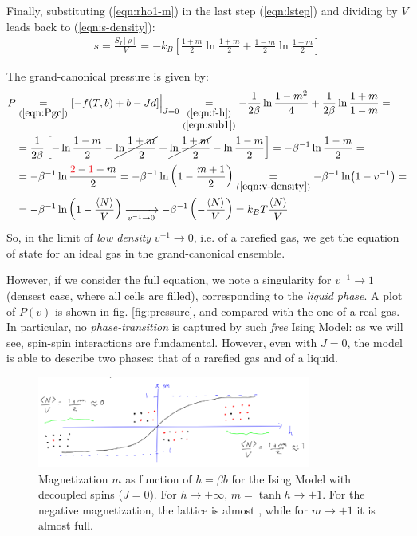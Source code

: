 \documentclass[../template.tex]{subfiles}
\begin{document}
\begin{example}
    \medskip

    Finally, substituting (\ref{eqn:rho1-m}) in the last step (\ref{eqn:lstep}) and dividing by $V$ leads back to (\ref{eqn:s-density}):
    \begin{align*}
        s = \frac{S_I[\rho]}{V} = -k_B\left[\frac{1+m}{2} \ln \frac{1+m}{2} + \frac{1-m}{2} \ln \frac{1-m}{2} \right] 
    \end{align*}

    The grand-canonical pressure is given by:
    \begin{align*}
        P &\underset{(\ref{eqn:Pgc})}{=}  [-f(T,b) + b - Jd]\Big|_{J=0} \underset{\substack{(\ref{eqn:f-h})\\(\ref{eqn:sub1})}}{=} -\frac{1}{2\beta} \ln \frac{1-m^2}{4} + \frac{1}{2\beta} \ln \frac{1+m}{1-m} = \\
        &=\frac{1}{2\beta} \left[-\ln \frac{1-m}{2} -\cancel{ \ln \frac{1+m}{2}} + \cancel{\ln \frac{1+m}{2} }- \ln \frac{1-m}{2}    \right] = -\beta^{-1} \ln \frac{1-m}{2} =\\
        &=-\beta^{-1} \ln \frac{\textcolor{Red}{2} - \textcolor{Red}{1}-m}{2} = -\beta^{-1} \ln\left(1-\frac{m+1}{2} \right) \underset{(\ref{eqn:v-density})}{=} -\beta^{-1} \ln(1- v^{-1}) =\\
        &= - \beta^{-1} \ln \left(1-\frac{\langle N \rangle}{V} \right) \xrightarrow[v^{-1} \to 0]{} -\beta^{-1} \left(-\frac{\langle N \rangle}{V}\right) = k_B T \frac{\langle N \rangle}{V} 
    \end{align*}
    So, in the limit of \textit{low density} $v^{-1} \to 0$, i.e. of a rarefied gas, we get the equation of state for an ideal gas in the grand-canonical ensemble.

    \medskip

    However, if we consider the full equation, we note a singularity for $v^{-1} \to 1$ (densest case, where all cells are filled), corresponding to the \textit{liquid phase}. A plot of $P(v)$ is shown in fig. \ref{fig:pressure}, and compared with the one of a real gas. In particular, no \textit{phase-transition} is captured by such \textit{free} Ising Model: as we will see, spin-spin interactions are fundamental. However, even with $J=0$, the model is able to describe two phases: that of a rarefied gas and of a liquid.
\end{example}


\begin{figure}[H]
    \centering
    \includegraphics[width=0.8\textwidth]{image014.png}
    \caption{Magnetization $m$ as function of $h = \beta b$ for the Ising Model with decoupled spins ($J=0$). For $h \to \pm \infty$, $m = \tanh h \to \pm 1$. For the negative magnetization, the lattice is almost , while for $m \to +1$ it is almost full.
    \label{fig:free-spin-m}} 
\end{figure} 
\end{document}
